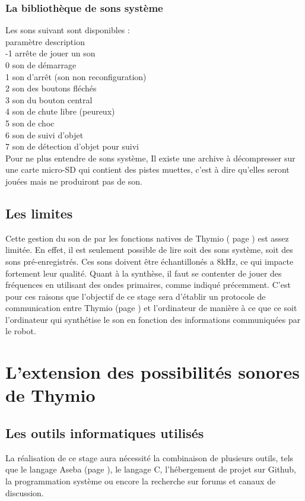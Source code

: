 \documentclass[a4paper, 12pt]{report}
\begin{document}
\subsection{La bibliothèque de sons système}
Les sons suivant sont disponibles :\\
paramètre           description\\
     -1             arrête de jouer un son\\
      0             son de démarrage\\
      1             son d'arrêt (son non reconfiguration)\\
      2             son des boutons fléchés\\
      3             son du bouton central\\
      4             son de chute libre (peureux)\\
      5             son de choc\\
      6             son de suivi d'objet\\
      7             son de détection d'objet pour suivi\\
Pour ne plus entendre de sons système, Il existe une archive à décompresser sur une carte micro-SD qui contient des pistes muettes, c'est à dire qu'elles seront jouées mais ne produiront pas de son.

\section{Les limites}
Cette gestion du son de par les fonctions natives de Thymio ( page \pageref{thymio} ) est assez limitée. En effet, il est seulement possible de lire soit des sons système, soit des sons pré-enregistrés. Ces sons doivent être échantillonés a 8kHz, ce qui impacte fortement leur qualité. Quant à la synthèse, il faut se contenter de jouer des fréquences en utilisant des ondes primaires, comme indiqué précemment. C'est pour ces raisons que l'objectif de ce stage sera d'établir un protocole de communication entre Thymio (page \pageref{thymio} ) et l'ordinateur de manière à ce que ce soit l'ordinateur qui synthétise le son en fonction des informations communiquées par le robot.

\chapter{L'extension des possibilités sonores de Thymio }
\section{Les outils informatiques utilisés}
La réalisation de ce stage aura nécessité la combinaison de plusieurs outils, tels que le langage Aseba (page \pageref{aseba} ), le langage C, l'hébergement de projet sur Github, la programmation système ou encore la recherche sur forums et canaux de discussion.
\end{document}
